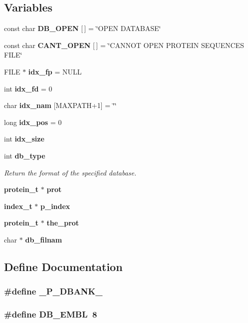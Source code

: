 \subsection*{Variables}
\begin{CompactItemize}
\item 
const char {\bf DB\_\-OPEN} [$\,$] = \char`\"{}OPEN DATABASE\char`\"{}
\item 
const char {\bf CANT\_\-OPEN} [$\,$] = \char`\"{}CANNOT OPEN PROTEIN SEQUENCES FILE\char`\"{}
\item 
FILE $\ast$ {\bf idx\_\-fp} = NULL
\item 
int {\bf idx\_\-fd} = 0
\item 
char {\bf idx\_\-nam} [MAXPATH+1] = \char`\"{}\char`\"{}
\item 
long {\bf idx\_\-pos} = 0
\item 
int {\bf idx\_\-size}
\item 
int {\bf db\_\-type}
\begin{CompactList}\small\item\em Return the format of the specified database.\item\end{CompactList}\item 
{\bf protein\_\-t} $\ast$ {\bf prot}
\item 
{\bf index\_\-t} $\ast$ {\bf p\_\-index}
\item 
{\bf protein\_\-t} $\ast$ {\bf the\_\-prot}
\item 
char $\ast$ {\bf db\_\-filnam}
\end{CompactItemize}


\subsection{Define Documentation}
\subsubsection{\setlength{\rightskip}{0pt plus 5cm}\#define \_\-P\_\-DBANK\_\-}\label{P__db_8c_a0}


\subsubsection{\setlength{\rightskip}{0pt plus 5cm}\#define DB\_\-EMBL\ 8}\label{P__db_8c_a11}


